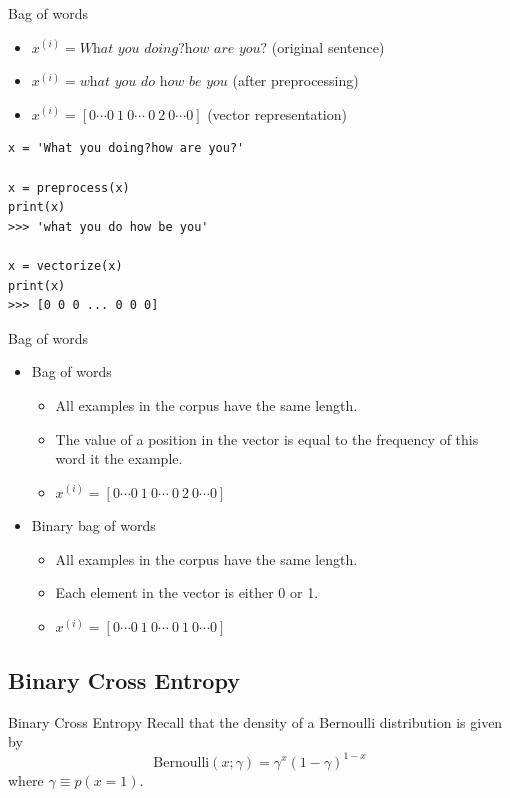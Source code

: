 \documentclass{beamer}
\newcommand{\bernoulli}{\mathrm{Bernoulli}}
\begin{document}
\begin{frame}[fragile]{Bag of words}
	\begin{itemize}
		\item $x^{(i)}=\textit{What you doing?how are you?}$ (original sentence)
		\item $x^{(i)}=\textit{what you do how be you}$ (after preprocessing)
		\item $x^{(i)}=[0\cdots0~1~0\cdots~0~2~0\cdots0]$ (vector representation)
	\end{itemize}
\begin{verbatim}
x = 'What you doing?how are you?'

x = preprocess(x)
print(x)
>>> 'what you do how be you'

x = vectorize(x)
print(x)
>>> [0 0 0 ... 0 0 0]
\end{verbatim}
\end{frame}

\begin{frame}[fragile]{Bag of words}
\begin{itemize}
	\item Bag of words
	\begin{itemize}
		\item All examples in the corpus have the same length. 
		\item The value of a position in the vector is equal to the frequency of this word it the example.
		\item $x^{(i)}=[0\cdots0~1~0\cdots~0~2~0\cdots0]$
	\end{itemize}
	\item Binary bag of words
	\begin{itemize}
		\item All examples in the corpus have the same length. 
		\item Each element in the vector is either 0 or 1.
		\item $x^{(i)}=[0\cdots0~1~0\cdots~0~1~0\cdots0]$
	\end{itemize}
\end{itemize}
\end{frame}

\subsection{Binary Cross Entropy}

\begin{frame}{Binary Cross Entropy}
	Recall that the density of a Bernoulli distribution is given by 
	\begin{equation}
	\bernoulli(x;\gamma) = \gamma^x(1-\gamma)^{1-x}
	\end{equation}
	where $\gamma\equiv p(x=1)$.
\end{frame}
\end{document}
